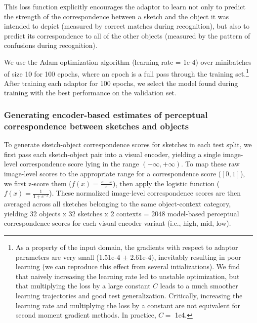 \documentclass[9pt,twocolumn,twoside]{pnas-new}
\begin{document}
{This loss function explicitly encourages the adaptor to learn not only to predict the strength of the correspondence between a sketch and the object it was intended to depict (measured by correct matches during recognition), but also to predict its correspondence to all of the other objects (measured by the pattern of confusions during recognition).

We use the Adam optimization algorithm \cite[]{kingma2014adam} (learning rate = 1e-4) over minibatches of size 10 for 100 epochs, where an epoch is a full pass through the training set.\footnote{As a property of the input domain, the gradients with respect to adaptor parameters are very small (1.51e-4 $\pm$ 2.61e-4), inevitably resulting in poor learning (we can reproduce this effect from several intializations). We find that naively increasing the learning rate led to unstable optimization, but that multiplying the loss by a large constant $C$ leads to a much smoother learning trajectories and good test generalization. Critically, increasing the learning rate and multiplying the loss by a constant are not equivalent for second moment gradient methods. In practice, $C =$ 1e4.}  
After training each adaptor for 100 epochs, we select the model found during training with the best performance on the validation set. 

\subsubsection*{Generating encoder-based estimates of perceptual correspondence between sketches and objects}

To generate sketch-object correspondence scores for sketches in each test split, we first pass each sketch-object pair into a visual encoder, yielding a single image-level correspondence score lying in the range $(-\infty,+\infty)$. 
To map these raw image-level scores to the appropriate range for a correspondence score ($[0,1]$), we first z-score them ($f(x) = \frac{x - \bar{x}}{\mathrm{s}}$), then apply the logistic function ($f(x)= \frac{1}{1+e^{-x}}$).
These normalized image-level correspondence scores are then averaged across all sketches belonging to the same object-context category, yielding 32 objects x 32 sketches x 2 contexts  = 2048 model-based perceptual correspondence scores for each visual encoder variant (i.e., high, mid, low).


}
\end{document}
